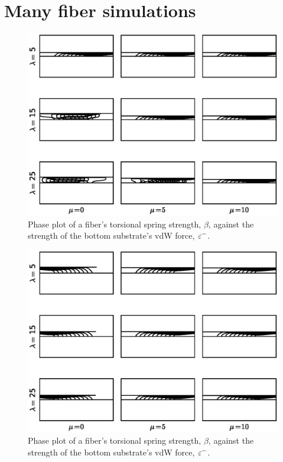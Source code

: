 \chapter{Many fiber simulations} \label{chap:four}

	\begin{figure}
		\begin{center}
			\includegraphics[scale=1]{./fig/ch4/grid.eps}
		\end{center}		
		\caption{Phase plot of a fiber's torsional spring strength, $\beta$, against the strength of the bottom substrate's vdW force, $\varepsilon^-$.
		\label{fig:grid}}
	\end{figure}

	\begin{figure}
		\begin{center}
			\includegraphics[scale=1]{./fig/ch4/grid_b100.eps}
		\end{center}		
		\caption{Phase plot of a fiber's torsional spring strength, $\beta$, against the strength of the bottom substrate's vdW force, $\varepsilon^-$.
		\label{fig:grid_b100}}
	\end{figure}
	
